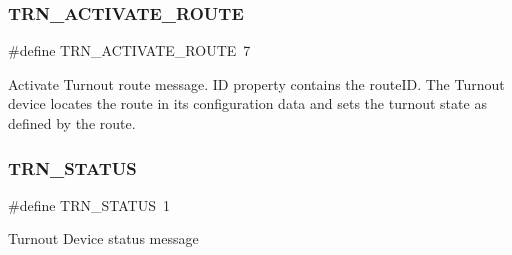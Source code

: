 \subsubsection{\texorpdfstring{T\+R\+N\+\_\+\+A\+C\+T\+I\+V\+A\+T\+E\+\_\+\+R\+O\+U\+TE}{TRN\_ACTIVATE\_ROUTE}}
{\footnotesize\ttfamily \#define T\+R\+N\+\_\+\+A\+C\+T\+I\+V\+A\+T\+E\+\_\+\+R\+O\+U\+TE~7}

Activate Turnout route message. ID property contains the route\+ID. The Turnout device locates the route in its configuration data and sets the turnout state as defined by the route. \mbox{\label{group___u_d_p_message_i_d_gacf1beacf20d9d977b8a27878039d43d7}} 
\subsubsection{\texorpdfstring{T\+R\+N\+\_\+\+S\+T\+A\+T\+US}{TRN\_STATUS}}
{\footnotesize\ttfamily \#define T\+R\+N\+\_\+\+S\+T\+A\+T\+US~1}

Turnout Device status message 